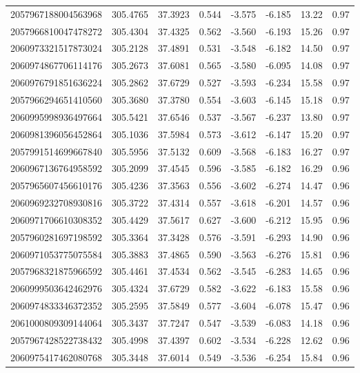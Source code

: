 \begin{longtable}{lccccccc}
2057967188004563968 & 305.4765 & 37.3923 & 0.544 & -3.575 & -6.185 & 13.22 & 0.97 \\
2057966810047478272 & 305.4304 & 37.4325 & 0.562 & -3.560 & -6.193 & 15.26 & 0.97 \\
2060973321517873024 & 305.2128 & 37.4891 & 0.531 & -3.548 & -6.182 & 14.50 & 0.97 \\
2060974867706114176 & 305.2673 & 37.6081 & 0.565 & -3.580 & -6.095 & 14.08 & 0.97 \\
2060976791851636224 & 305.2862 & 37.6729 & 0.527 & -3.593 & -6.234 & 15.58 & 0.97 \\
2057966294651410560 & 305.3680 & 37.3780 & 0.554 & -3.603 & -6.145 & 15.18 & 0.97 \\
2060995998936497664 & 305.5421 & 37.6546 & 0.537 & -3.567 & -6.237 & 13.80 & 0.97 \\
2060981396056452864 & 305.1036 & 37.5984 & 0.573 & -3.612 & -6.147 & 15.20 & 0.97 \\
2057991514699667840 & 305.5956 & 37.5132 & 0.609 & -3.568 & -6.183 & 16.27 & 0.97 \\
2060967136764958592 & 305.2099 & 37.4545 & 0.596 & -3.585 & -6.182 & 16.29 & 0.96 \\
2057965607456610176 & 305.4236 & 37.3563 & 0.556 & -3.602 & -6.274 & 14.47 & 0.96 \\
2060969232708930816 & 305.3722 & 37.4314 & 0.557 & -3.618 & -6.201 & 14.57 & 0.96 \\
2060971706610308352 & 305.4429 & 37.5617 & 0.627 & -3.600 & -6.212 & 15.95 & 0.96 \\
2057960281697198592 & 305.3364 & 37.3428 & 0.576 & -3.591 & -6.293 & 14.90 & 0.96 \\
2060971053775075584 & 305.3883 & 37.4865 & 0.590 & -3.563 & -6.276 & 15.81 & 0.96 \\
2057968321875966592 & 305.4461 & 37.4534 & 0.562 & -3.545 & -6.283 & 14.65 & 0.96 \\
2060999503642462976 & 305.4324 & 37.6729 & 0.582 & -3.622 & -6.183 & 15.58 & 0.96 \\
2060974833346372352 & 305.2595 & 37.5849 & 0.577 & -3.604 & -6.078 & 15.47 & 0.96 \\
2061000809309144064 & 305.3437 & 37.7247 & 0.547 & -3.539 & -6.083 & 14.18 & 0.96 \\
2057967428522738432 & 305.4998 & 37.4397 & 0.602 & -3.534 & -6.228 & 12.62 & 0.96 \\
2060975417462080768 & 305.3448 & 37.6014 & 0.549 & -3.536 & -6.254 & 15.84 & 0.96 \\

\end{longtable}
